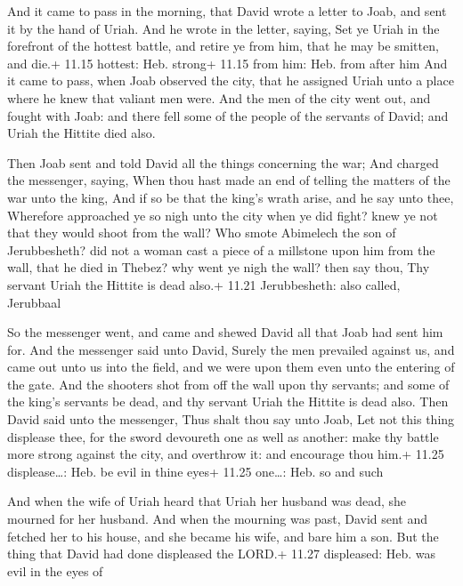  And it came to pass in the morning, that David wrote a
letter to Joab, and sent it by the hand of Uriah.  And he
wrote in the letter, saying, Set ye Uriah in the forefront of the
hottest battle, and retire ye from him, that he may be smitten, and
die.+ 11.15 hottest: Heb. strong+ 11.15 from him: Heb. from after him
 And it came to pass, when Joab observed the city, that he
assigned Uriah unto a place where he knew that valiant men were.
 And the men of the city went out, and fought with Joab:
and there fell some of the people of the servants of David; and Uriah
the Hittite died also.

 Then Joab sent and told David all the things concerning
the war;  And charged the messenger, saying, When thou hast
made an end of telling the matters of the war unto the king,
 And if so be that the king's wrath arise, and he say unto
thee, Wherefore approached ye so nigh unto the city when ye did fight?
knew ye not that they would shoot from the wall?  Who smote
Abimelech the son of Jerubbesheth? did not a woman cast a piece of a
millstone upon him from the wall, that he died in Thebez? why went ye
nigh the wall? then say thou, Thy servant Uriah the Hittite is dead
also.+ 11.21 Jerubbesheth: also called, Jerubbaal

 So the messenger went, and came and shewed David all
that Joab had sent him for.  And the messenger said unto
David, Surely the men prevailed against us, and came out unto us into
the field, and we were upon them even unto the entering of the gate.
 And the shooters shot from off the wall upon thy servants;
and some of the king's servants be dead, and thy servant Uriah the
Hittite is dead also.  Then David said unto the messenger,
Thus shalt thou say unto Joab, Let not this thing displease thee, for
the sword devoureth one as well as another: make thy battle more strong
against the city, and overthrow it: and encourage thou him.+ 11.25
displease\ldots: Heb. be evil in thine eyes+ 11.25 one\ldots: Heb. so
and such

 And when the wife of Uriah heard that Uriah her husband
was dead, she mourned for her husband.  And when the
mourning was past, David sent and fetched her to his house, and she
became his wife, and bare him a son. But the thing that David had done
displeased the LORD.+ 11.27 displeased: Heb. was evil in the eyes of

